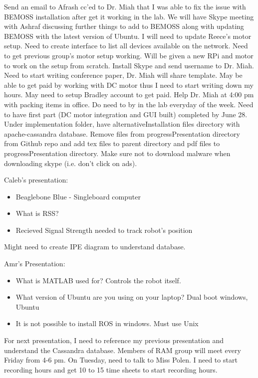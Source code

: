 \documentclass[fontsize=11pt, %
                             paper=letter, %
                             twoside, %
                             captions=tableheading,
                             index=totoc,
                             hyperref]{labbook}
\begin{document}
\begin{addmargin}[0cm]{0cm}
Send an email to Afrash cc'ed to Dr. Miah that I was able to fix the issue with BEMOSS installation after get it working in the lab. We will have Skype meeting with Ashraf discussing further things to add to BEMOSS along with updating BEMOSS with the latest version of Ubuntu. 
\bigbreak\noindent
I will need to update Reece's motor setup. Need to create interface to list all devices available on the network. Need to get previous group's motor setup working. Will be given a new RPi and motor to work on the setup from scratch.
\bigbreak\noindent
Install Skype and send username to Dr. Miah.
\bigbreak\noindent
Need to start writing conference paper, Dr. Miah will share template.
\bigbreak\noindent
May be able to get paid by working with DC motor thus I need to start writing down my hours. May need to setup Bradley account to get paid. 
\bigbreak\noindent
Help Dr. Miah at 4:00 pm with packing items in office. 
\bigbreak\noindent
Do need to by in the lab everyday of the week.
\bigbreak\noindent
Need to have first part (DC motor integration and GUI built) completed by June 28.
\bigbreak\noindent
Under implementation folder, have alternativeInstallation files directory with apache-cassandra database. 
\bigbreak\noindent
Remove files from progressPresentation directory from Github repo and add tex files to parent directory and pdf files to progressPresentation directory.
\bigbreak\noindent
Make sure not to download malware when downloading skype (i.e. don't click on ads).

Caleb's presentation:
\bigbreak\noindent
\begin{itemize}
\item Beaglebone Blue - Singleboard computer
\item What is RSS?
\item Recieved Signal Strength needed to track robot's position
\end{itemize}
Might need to create IPE diagram to understand database.  

Amr's Presentation:
\bigbreak\noindent
\begin{itemize}
	\item What is MATLAB used for?
	Controls the robot itself.
	\item What version of Ubuntu are you using on your laptop?
	Dual boot windows, Ubuntu
	\item It is not possible to install ROS in windows. Must use Unix
\end{itemize}
For next presentation, I need to reference my previous presentation and understand the Cassandra database.
\bigbreak\noindent
Members of RAM group will meet every Friday from 4-6 pm.
On Tuesday, need to talk to Miss Polen. I need to start recording hours and get 10 to 15 time sheets to start recording hours.


\end{addmargin}
\end{document}
